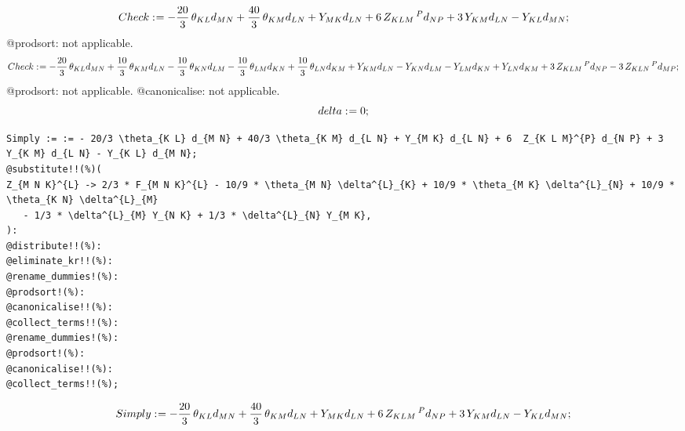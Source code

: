 \documentclass[11pt]{article}
\def\specialcolon{\mathrel{\mathop{:}}\hspace{-.5em}}
\begin{document}
\begin{dmath*}[compact, spread=2pt]
Check\specialcolon{}=  - \frac{20}{3}\, {\theta}_{K L} {d}_{M N} + \frac{40}{3}\, {\theta}_{K M} {d}_{L N} + {Y}_{M K} {d}_{L N} + 6\, {Z}_{K L M}\,^{P} {d}_{N P} + 3\, {Y}_{K M} {d}_{L N} - {Y}_{K L} {d}_{M N};
\end{dmath*}
@prodsort: not applicable.
\begin{dmath*}[compact, spread=2pt]
Check\specialcolon{}=  - \frac{20}{3}\, {\theta}_{K L} {d}_{M N} + \frac{10}{3}\, {\theta}_{K M} {d}_{L N} - \frac{10}{3}\, {\theta}_{K N} {d}_{L M} - \frac{10}{3}\, {\theta}_{L M} {d}_{K N} + \frac{10}{3}\, {\theta}_{L N} {d}_{K M} + {Y}_{K M} {d}_{L N} - {Y}_{K N} {d}_{L M} - {Y}_{L M} {d}_{K N} + {Y}_{L N} {d}_{K M} + 3\, {Z}_{K L M}\,^{P} {d}_{N P} - 3\, {Z}_{K L N}\,^{P} {d}_{M P};
\end{dmath*}
@prodsort: not applicable.
@canonicalise: not applicable.
\begin{dmath*}[compact, spread=2pt]
delta\specialcolon{}= 0;
\end{dmath*}
{\color[named]{Blue}\begin{verbatim}
Simply := := - 20/3 \theta_{K L} d_{M N} + 40/3 \theta_{K M} d_{L N} + Y_{M K} d_{L N} + 6  Z_{K L M}^{P} d_{N P} + 3 Y_{K M} d_{L N} - Y_{K L} d_{M N};
@substitute!!(%)(
Z_{M N K}^{L} -> 2/3 * F_{M N K}^{L} - 10/9 * \theta_{M N} \delta^{L}_{K} + 10/9 * \theta_{M K} \delta^{L}_{N} + 10/9 * \theta_{K N} \delta^{L}_{M}
   - 1/3 * \delta^{L}_{M} Y_{N K} + 1/3 * \delta^{L}_{N} Y_{M K},
):
@distribute!!(%):
@eliminate_kr!!(%):
@rename_dummies!(%):
@prodsort!(%):
@canonicalise!!(%):
@collect_terms!!(%):
@rename_dummies!(%):
@prodsort!(%):
@canonicalise!!(%):
@collect_terms!!(%);
\end{verbatim}}
\begin{dmath*}[compact, spread=2pt]
Simply\specialcolon{}=  - \frac{20}{3}\, {\theta}_{K L} {d}_{M N} + \frac{40}{3}\, {\theta}_{K M} {d}_{L N} + {Y}_{M K} {d}_{L N} + 6\, {Z}_{K L M}\,^{P} {d}_{N P} + 3\, {Y}_{K M} {d}_{L N} - {Y}_{K L} {d}_{M N};
\end{dmath*}
\end{document}
